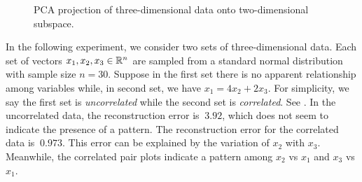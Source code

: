 \begin{figure}
    \centering
    \caption{PCA projection of three-dimensional data onto two-dimensional subspace.}
    \label{fig:pca-code}
\end{figure}
In the following experiment, we consider two sets of three-dimensional data.
Each set of vectors \(x_1, x_2, x_3 \in \mathbb{R}^n\) are sampled from a standard normal distribution with sample size \(n = 30\).
Suppose in the first set there is no apparent relationship among variables while, in second set, we have \(x_1 = 4x_2 + 2x_3\).
For simplicity, we say the first set is \textit{uncorrelated} while the second set is \textit{correlated}.
See .
In the uncorrelated data, the reconstruction error is \(~ 3.92\), which does not seem to indicate the presence of a pattern.
The reconstruction error for the correlated data is \(~ 0.973\).
This error can be explained by the variation of \(x_2\) with \(x_3\).
Meanwhile, the correlated pair plots indicate a pattern among \(x_2\) vs \(x_1\) and \(x_3\) vs \(x_1\).